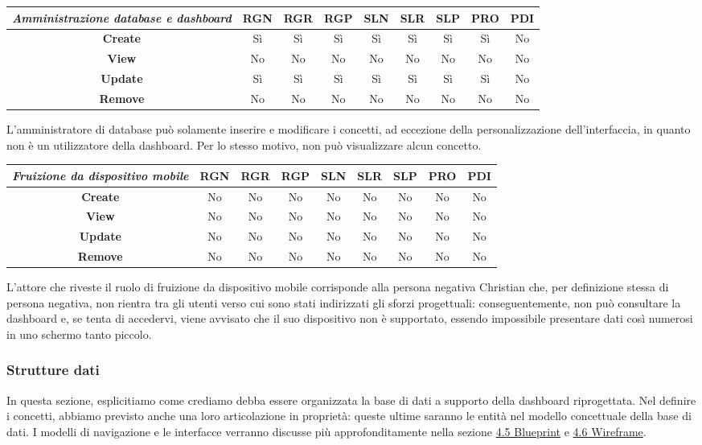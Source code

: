 {
\renewcommand{\arraystretch}{2}
\begin{longtable}[h]{| c | c | c | c | c | c | c | c | c |}
    \hline
    \textit{Amministrazione database e dashboard} & \textbf{RGN} & \textbf{RGR} & \textbf{RGP} & \textbf{SLN} & \textbf{SLR} & \textbf{SLP} & \textbf{PRO} & \textbf{PDI} \\
    \hline
    \endhead
    \textbf{Create} & Sì & Sì & Sì & Sì & Sì & Sì & Sì & No \\
    \hline
    \textbf{View}   & No & No & No & No & No & No & No & No \\
    \hline
    \textbf{Update} & Sì & Sì & Sì & Sì & Sì & Sì & Sì & No \\
    \hline
    \textbf{Remove} & No & No & No & No & No & No & No & No \\
    \hline
\end{longtable}
}
\noindent
L'amministratore di database può solamente inserire e modificare i concetti, ad eccezione della personalizzazione dell'interfaccia, in quanto non è un utilizzatore della dashboard.
Per lo stesso motivo, non può visualizzare alcun concetto.

{
\renewcommand{\arraystretch}{2}
\begin{longtable}[h]{| c | c | c | c | c | c | c | c | c |}
    \hline
    \textit{Fruizione da dispositivo mobile} & \textbf{RGN} & \textbf{RGR} & \textbf{RGP} & \textbf{SLN} & \textbf{SLR} & \textbf{SLP} & \textbf{PRO} & \textbf{PDI} \\
    \hline
    \endhead
    \textbf{Create} & No & No & No & No & No & No & No & No \\
    \hline
    \textbf{View}   & No & No & No & No & No & No & No & No \\
    \hline
    \textbf{Update} & No & No & No & No & No & No & No & No \\
    \hline
    \textbf{Remove} & No & No & No & No & No & No & No & No \\
    \hline
\end{longtable}
}
\noindent
L'attore che riveste il ruolo di fruizione da dispositivo mobile corrisponde alla persona negativa Christian che, per definizione stessa di persona negativa, non rientra tra gli utenti verso cui sono stati indirizzati gli sforzi progettuali: conseguentemente, non può consultare la dashboard e, se tenta di accedervi, viene avvisato che il suo dispositivo non è supportato, essendo impossibile presentare dati così numerosi in uno schermo tanto piccolo.

\subsubsection{Strutture dati}
\label{sss:strutture-dati}
In questa sezione, esplicitiamo come crediamo debba essere organizzata la base di dati a supporto della dashboard riprogettata. Nel definire i concetti, abbiamo previsto anche una loro articolazione in proprietà: queste ultime saranno le entità nel modello concettuale della base di dati.
I modelli di navigazione e le interfacce verranno discusse più approfonditamente nella sezione \hyperref[s:struttura-blueprint]{4.5 Blueprint} e \hyperref[s:wireframe]{4.6 Wireframe}.